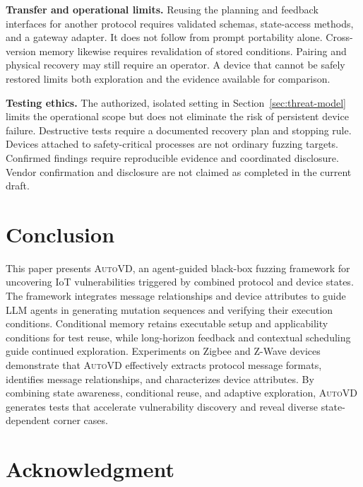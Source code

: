 \documentclass[10pt,journal,compsoc]{IEEEtran}
\newcommand{\system}{\textsc{AutoVD}}
\newcommand{\parab}[1]{\vspace{0.04in}\noindent\textbf{#1}}
\begin{document}
\parab{Transfer and operational limits.}
Reusing the planning and feedback interfaces for another protocol requires validated schemas, state-access methods, and a gateway adapter. It does not follow from prompt portability alone. Cross-version memory likewise requires revalidation of stored conditions. Pairing and physical recovery may still require an operator. A device that cannot be safely restored limits both exploration and the evidence available for comparison.

\parab{Testing ethics.}
The authorized, isolated setting in Section~\ref{sec:threat-model} limits the operational scope but does not eliminate the risk of persistent device failure. Destructive tests require a documented recovery plan and stopping rule. Devices attached to safety-critical processes are not ordinary fuzzing targets. Confirmed findings require reproducible evidence and coordinated disclosure. Vendor confirmation and disclosure are not claimed as completed in the current draft.

\section{Conclusion}\label{sec:conclusion}
This paper presents \system{}, an agent-guided black-box fuzzing framework for uncovering IoT vulnerabilities triggered by combined protocol and device states. The framework integrates message relationships and device attributes to guide LLM agents in generating mutation sequences and verifying their execution conditions. Conditional memory retains executable setup and applicability conditions for test reuse, while long-horizon feedback and contextual scheduling guide continued exploration. Experiments on Zigbee and Z-Wave devices demonstrate that \system{} effectively extracts protocol message formats, identifies message relationships, and characterizes device attributes. By combining state awareness, conditional reuse, and adaptive exploration, \system{} generates tests that accelerate vulnerability discovery and reveal diverse state-dependent corner cases.

\section*{Acknowledgment}



\end{document}
